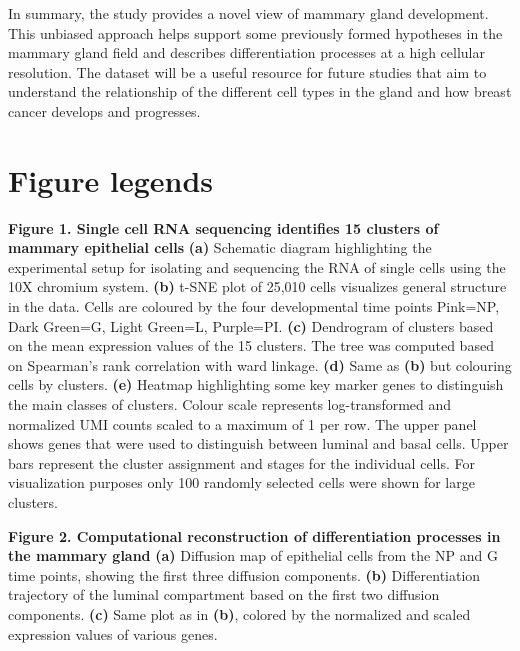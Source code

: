 \documentclass[titlepage, 12pt, oneside]{amsart}
\newcommand{\fakefigure}[1]%
{\refstepcounter{figure}\label{#1}}
\begin{document}
In summary, the study provides a novel view of mammary gland development.
This unbiased approach helps support some previously formed hypotheses in the mammary gland field and describes differentiation processes at a high cellular resolution.
The dataset will be a useful resource for future studies that aim to understand the relationship of the different cell types in the gland and how breast cancer develops and progresses.

\section{Figure legends}

\textbf{Figure 1. Single cell RNA sequencing identifies 15 clusters of mammary epithelial cells }
\fakefigure{F1}
\textbf{(a)} Schematic diagram highlighting the experimental setup for isolating and sequencing the RNA of single cells using the 10X chromium system.
\textbf{(b)} t-SNE plot of 25,010 cells visualizes general structure in the data.
Cells are coloured by the four developmental time points Pink=NP, Dark Green=G, Light Green=L, Purple=PI.
\textbf{(c)} Dendrogram of clusters based on the mean expression values of the 15 clusters. The tree was computed based on Spearman's rank correlation with ward linkage.
\textbf{(d)} Same as \textbf{(b)} but colouring cells by clusters.
\textbf{(e)} Heatmap highlighting some key marker genes to distinguish the main classes of clusters.
Colour scale represents log-transformed and normalized UMI counts scaled to a maximum of 1 per row.
The upper panel shows genes that were used to distinguish between luminal and basal cells.
Upper bars represent the cluster assignment and stages for the individual cells.
For visualization purposes only 100 randomly selected cells were shown for large clusters.


\textbf{Figure 2. Computational reconstruction of differentiation processes in the mammary gland}
\fakefigure{F2}
\textbf{(a)} Diffusion map of epithelial cells from the NP and G time points, showing the first three diffusion components.
\textbf{(b)} Differentiation trajectory of the luminal compartment based on the first two diffusion components.
\textbf{(c)} Same plot as in \textbf{(b)}, colored by the normalized and scaled expression values of various genes.
\end{document}
